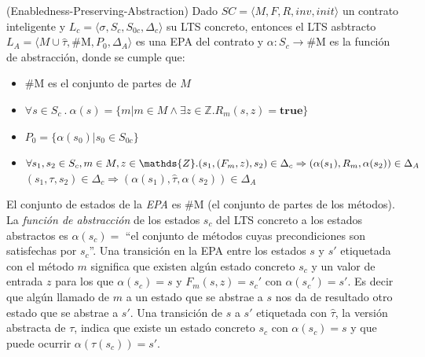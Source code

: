 \begin{definition}\label{definicion-epa}(Enabledness-Preserving-Abstraction) Dado $SC = \langle M, F, R, inv, init \rangle$ un contrato inteligente y $L_c = \langle \sigma , S_c, S_{0c}, \Delta _c \rangle$ su LTS concreto, entonces el LTS asbtracto $L_A = \langle M \cup \hat{\tau} , \text{\#M}, P_0, \Delta _A \rangle$ es una EPA del contrato y $\alpha : S_c \rightarrow \text{\#M}$ es la función de abstracción, donde se cumple que:
    \begin{itemize}
        \item $\text{\#M}$ es el conjunto de partes de $M$
        \item $\forall s \in S_c \: . \:
                  \alpha(s) = \{m | m \in M \land \exists z \in \mathds{Z} . R_m(s,z) = \textbf{true}\}$
        \item $P_0 = \{\alpha(s_0) | s_0 \in S_{0c} \}$
        \item $\forall s_1,s_2 \in S_c, m \in M, z \in \mathds{Z} . \\ (s_1,(F_m,z),s_2) \in \Delta _c \Rightarrow (\alpha(s_1),R_m,\alpha(s_2)) \in \Delta _A$ \\
              $(s_1,\tau,s_2) \in \Delta _c \Rightarrow (\alpha(s_1),\hat{\tau},\alpha(s_2)) \in \Delta _A$
    \end{itemize}
\end{definition}

El conjunto de estados de la \textit{EPA} es $\text{\#M}$ (el conjunto de partes de los métodos).
La \textit{función de abstracción} de los estados $s_c$ del LTS concreto a los estados abstractos es $\alpha (s_c) = $ ``el conjunto de métodos cuyas precondiciones son satisfechas por $s_c$''.
Una transición en la EPA entre los estados $s$ y $s'$ etiquetada con el método $m$ significa que existen algún estado concreto $s_c$ y un valor de entrada $z$ para los que $\alpha(s_c) = s$ y  $F_m(s,z)=s_c'$ con $\alpha(s_c') = s'$.
Es decir que algún llamado de $m$ a un estado que se abstrae a $s$ nos da de resultado otro estado que se abstrae a $s'$.
Una transición de $s$ a $s'$ etiquetada  con $\hat{\tau}$, la versión abstracta de $\tau$, indica que existe un estado concreto $s_c$ con $\alpha(s_c) = s$ y que puede ocurrir $\alpha (\tau (s_c)) = s'$.
